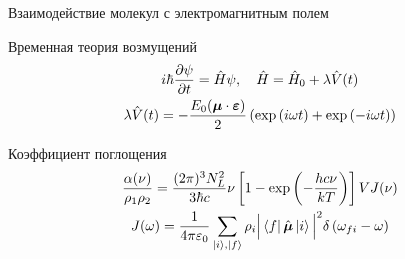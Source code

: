 \documentclass[10pt,usenames,pdf,hyperref={unicode},dvipsnames]{beamer}
\newcommand{\lb}{\left(}
\newcommand{\rb}{\right)}
\newcommand{\lsq}{\left[}
\newcommand{\rsq}{\right]}
\newcommand{\bmu}{\boldsymbol{\mu}}
\begin{document}
\begin{frame}{{\large Взаимодействие молекул с электромагнитным полем}}
    \vspace*{-0.3cm}
    \begin{block}{Временная теория возмущений}
    \vspace*{-0.5cm}
	\begin{gather}
		i \hbar \frac{\partial \psi}{\partial t} = \hat{H} \psi, \quad \hat{H} = \hat{H}_0 + \lambda \hat{V}(t) \notag \\
        \lambda \hat{V}(t) = - \frac{E_0 (\bmu \cdot \boldsymbol{\varepsilon})}{2} \lb \exp \lb i \omega t \rb + \exp \lb - i \omega t \rb \rb \notag
	\end{gather}
\end{block}

\begin{block}{Коэффициент поглощения}
    \vspace*{-0.5cm}
	\begin{gather}
		\frac{\alpha(\nu)}{\rho_1 \rho_2} = \frac{(2 \pi)^3 N_L^2}{3 \hbar c} \nu \lsq 1 - \exp \lb - \frac{h c \nu}{k T} \rb \rsq V J(\nu) \notag \\ 
		J(\omega) = \frac{1}{4 \pi \varepsilon_0} \sum_{\ket{i}, \ket{f}} \rho_i \Big{|} \bra{f} \hat{\boldsymbol{\mu}} \ket{i} \Big{|}^2 \delta \lb \omega_{fi} - \omega \rb \notag 
	\end{gather}
\end{block}
\end{frame}
\end{document}

